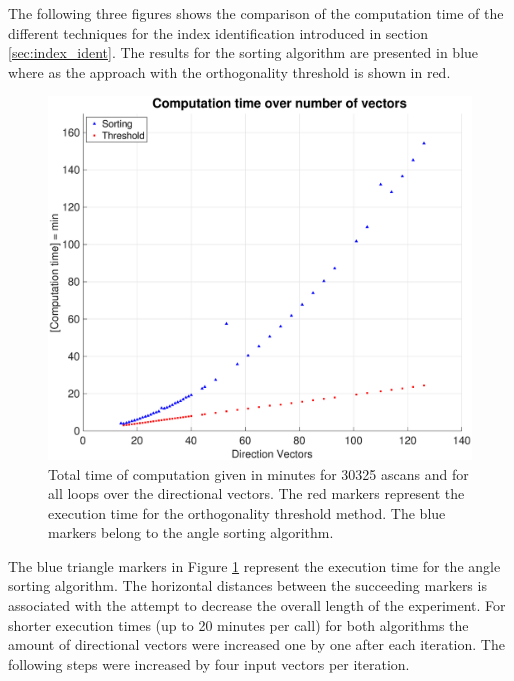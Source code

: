 The following three figures shows the comparison of the computation time of the different techniques for the index identification introduced in section \ref{sec:index_ident}. The results for the sorting algorithm are presented in blue where as the approach with the orthogonality threshold is shown in red.

\begin{figure}[H]
    \centering
    \includegraphics[width=1\linewidth]{Graphics/Results/complete_computation_time_over_numer_vec.eps}
    \caption{Total time of computation given in minutes for 30325 \acp{ascan} and for all loops over the directional vectors. The red markers represent the execution time for the orthogonality threshold method. The blue markers belong to the angle sorting algorithm.}
    \label{fig:Complete_computation_all_vecs}
\end{figure}

The blue triangle markers in Figure \ref{fig:Complete_computation_all_vecs} represent the execution time for the angle sorting algorithm. The horizontal distances between the succeeding markers is associated with the attempt to decrease the overall length of the experiment. For shorter execution times (up to 20 minutes per call) for both algorithms the amount of directional vectors were increased one by one after each iteration. The following steps were increased by four input vectors per iteration.

